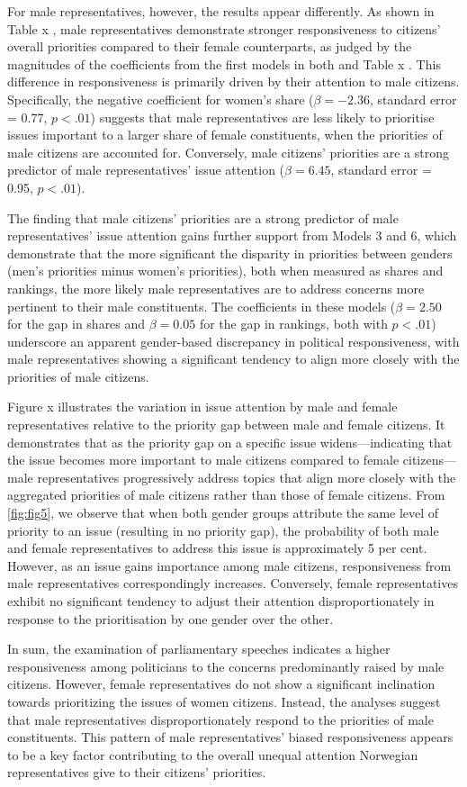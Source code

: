 For male representatives, however, the results appear differently. As shown in Table x , male representatives demonstrate stronger responsiveness to citizens' overall priorities compared to their female counterparts, as judged by the magnitudes of the coefficients from the first models in both and Table x . This difference in responsiveness is primarily driven by their attention to male citizens. Specifically, the negative coefficient for women's share ($\beta = -2.36$, standard error = 0.77, $p < .01$) suggests that male representatives are less likely to prioritise issues important to a larger share of female constituents, when the priorities of male citizens are accounted for. Conversely, male citizens' priorities are a strong predictor of male representatives' issue attention ($\beta = 6.45$, standard error = 0.95, $p < .01$).




The finding that male citizens' priorities are a strong predictor of male representatives' issue attention gains further support from Models 3 and 6, which demonstrate that the more significant the disparity in priorities between genders (men's priorities minus women's priorities), both when measured as shares and rankings, the more likely male representatives are to address concerns more pertinent to their male constituents. The coefficients in these models ($\beta = 2.50$ for the gap in shares and $\beta = 0.05$ for the gap in rankings, both with $p < .01$) underscore an apparent gender-based discrepancy in political responsiveness, with male representatives showing a significant tendency to align more closely with the priorities of male citizens. 

Figure x illustrates the variation in issue attention by male and female representatives relative to the priority gap between male and female citizens. It demonstrates that as the priority gap on a specific issue widens—indicating that the issue becomes more important to male citizens compared to female citizens—male representatives progressively address topics that align more closely with the aggregated priorities of male citizens rather than those of female citizens. From \cref{fig:fig5}, we observe that when both gender groups attribute the same level of priority to an issue (resulting in no priority gap), the probability of both male and female representatives to address this issue is approximately 5 per cent. However, as an issue gains importance among male citizens, responsiveness from male representatives correspondingly increases. Conversely, female representatives exhibit no significant tendency to adjust their attention disproportionately in response to the prioritisation by one gender over the other. 


In sum, the examination of parliamentary speeches indicates a higher responsiveness among politicians to the concerns predominantly raised by male citizens. However, female representatives do not show a significant inclination towards prioritizing the issues of women citizens. Instead, the analyses suggest that male representatives disproportionately respond to the priorities of male constituents. This pattern of male representatives' biased responsiveness appears to be a key factor contributing to the overall unequal attention Norwegian representatives give to their citizens' priorities.